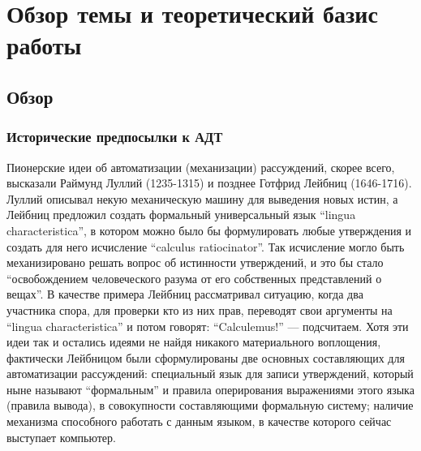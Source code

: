 \chapter{Обзор темы и теоретический базис работы}
\label{basis}

\section{Обзор}


\subsection{Исторические предпосылки к АДТ}
Пионерские идеи об автоматизации (механизации) рассуждений, скорее всего, высказали Раймунд Луллий (1235-1315) и позднее Готфрид Лейбниц (1646-1716). Луллий описывал некую механическую машину для выведения новых истин, а Лейбниц предложил создать формальный универсальный язык ``lingua characteristica'', в котором можно было бы формулировать любые утверждения и создать для него исчисление ``calculus ratiocinator''. Так исчисление могло быть механизировано решать вопрос об истинности утверждений, и это бы стало ``освобождением человеческого разума от его собственных представлений о вещах''. В качестве примера Лейбниц рассматривал ситуацию, когда два участника спора, для проверки кто из них прав, переводят свои аргументы на ``lingua characteristica'' и потом говорят: ``Calculemus!'' --- подсчитаем. Хотя эти идеи так и остались идеями не найдя никакого материального воплощения, фактически Лейбницом были сформулированы две основных составляющих для автоматизации рассуждений: специальный язык для записи утверждений, который ныне называют ``формальным'' и правила оперирования выражениями этого языка (правила вывода), в совокупности составляющими формальную систему; наличие механизма способного работать с данным языком, в качестве которого сейчас выступает компьютер.

